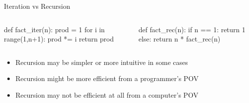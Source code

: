\documentclass[pdf, aspectratio=169, 12pt]{beamer}
\begin{document}
\begin{frame}[fragile]{Iteration vs Recursion}
	\begin{columns}
		\begin{pythoncode}[tabsize=2]
			def fact_iter(n):
				prod = 1
				for i in range(1,n+1):
					prod *= i
				return prod
		\end{pythoncode}
		\begin{pythoncode}[tabsize=2]
			def fact_rec(n):
				if n == 1:
					return 1
				else:
					return n * fact_rec(n)
		\end{pythoncode}
	\end{columns}

	\vspace{5mm}
	\begin{itemize}
		\item Recursion may be simpler or more intuitive in some cases
		\item Recursion might be more efficient from a programmer's POV
		\item Recursion may not be efficient at all from a computer's POV
	\end{itemize}
\end{frame}
\end{document}
